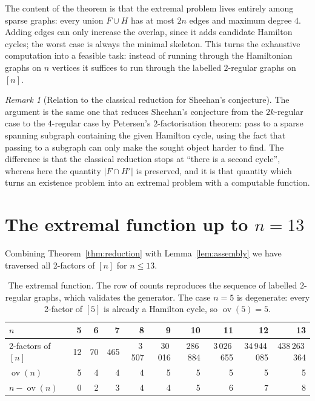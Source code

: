 \documentclass[11pt,a4paper]{article}
\theoremstyle{definition}
\theoremstyle{remark}
\newtheorem{remark}[theorem]{Remark}
\newcommand{\ov}{\operatorname{ov}}
\begin{document}
The content of the theorem is that the extremal problem lives entirely among sparse graphs: every union $F\cup H$ has at most $2n$ edges and maximum degree $4$. Adding edges can only increase the overlap, since it adds candidate Hamilton cycles; the worst case is always the minimal skeleton. This turns the exhaustive computation into a feasible task: instead of running through the Hamiltonian graphs on $n$ vertices it suffices to run through the labelled $2$-regular graphs on $[n]$.

\begin{remark}[Relation to the classical reduction for Sheehan's conjecture]\label{rem:classical}
The argument is the same one that reduces Sheehan's conjecture from the $2k$-regular case to the $4$-regular case by Petersen's $2$-factorisation theorem: pass to a sparse spanning subgraph containing the given Hamilton cycle, using the fact that passing to a subgraph can only make the sought object harder to find. The difference is that the classical reduction stops at ``there is a second cycle'', whereas here the quantity $|F\cap H'|$ is preserved, and it is that quantity which turns an existence problem into an extremal problem with a computable function.
\end{remark}

\section{The extremal function up to \texorpdfstring{$n=13$}{n=13}}\label{sec:exact}

Combining Theorem~\ref{thm:reduction} with Lemma~\ref{lem:assembly} we have traversed all 2-factors of $[n]$ for $n\le13$.

\begin{table}[h]
\centering\small
\setlength{\tabcolsep}{4.5pt}
\begin{tabular}{lrrrrrrrrr}
\toprule
$n$ & 5 & 6 & 7 & 8 & 9 & 10 & 11 & 12 & 13\\
\midrule
2-factors of $[n]$ & 12 & 70 & 465 & 3\,507 & 30\,016 & 286\,884 & 3\,026\,655 & 34\,944\,085 & 438\,263\,364\\
$\ov(n)$ & 5 & 4 & 4 & 4 & 5 & 5 & 5 & 5 & 5\\
$n-\ov(n)$ & 0 & 2 & 3 & 4 & 4 & 5 & 6 & 7 & 8\\
\bottomrule
\end{tabular}
\caption{The extremal function. The row of counts reproduces the sequence of labelled $2$-regular graphs, which validates the generator. The case $n=5$ is degenerate: every 2-factor of $[5]$ is already a Hamilton cycle, so $\ov(5)=5$.}\label{tab:ov}
\end{table}
\end{document}
